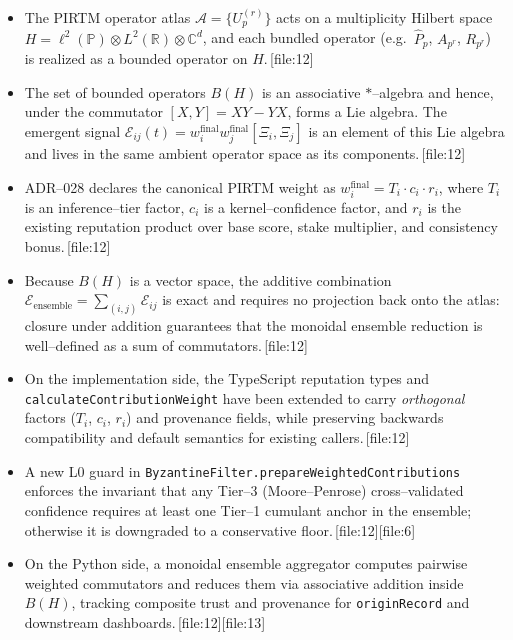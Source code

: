 \documentclass[11pt]{article}
\begin{document}
\begin{itemize}[leftmargin=*]
  \item The PIRTM operator atlas \(\mathcal{A} = \{U_p^{(r)}\}\) acts on a
  multiplicity Hilbert space
  \(H = \ell^2(\mathbb{P}) \otimes L^2(\mathbb{R}) \otimes \mathbb{C}^d\),
  and each bundled operator (e.g.\ \(\hat{P}_p\), \(A_{p^r}\), \(R_{p^r}\))
  is realized as a bounded operator on \(H\).\,[file:12]

  \item The set of bounded operators \(B(H)\) is an associative \(*\)--algebra
  and hence, under the commutator \([X,Y] = XY - YX\), forms a Lie algebra.
  The emergent signal
  \(\mathcal{E}_{ij}(t) = w_i^{\text{final}} w_j^{\text{final}} [\Xi_i,\Xi_j]\)
  is an element of this Lie algebra and lives in the same ambient operator
  space as its components.\,[file:12]

  \item ADR--028 declares the canonical PIRTM weight as
  \(w_i^{\text{final}} = T_i \cdot c_i \cdot r_i\), where
  \(T_i\) is an inference--tier factor, \(c_i\) is a kernel--confidence factor,
  and \(r_i\) is the existing reputation product over
  base score, stake multiplier, and consistency bonus.\,[file:12]

  \item Because \(B(H)\) is a vector space, the additive combination
  \(\mathcal{E}_{\text{ensemble}} = \sum_{(i,j)} \mathcal{E}_{ij}\) is exact
  and requires no projection back onto the atlas: closure under addition
  guarantees that the monoidal ensemble reduction is well--defined as a sum of
  commutators.\,[file:12]

  \item On the implementation side, the TypeScript reputation types and
  \texttt{calculateContributionWeight} have been extended to carry
  \emph{orthogonal} factors (\(T_i\), \(c_i\), \(r_i\)) and provenance fields,
  while preserving backwards compatibility and default semantics for existing
  callers.\,[file:12]

  \item A new L0 guard in
  \texttt{ByzantineFilter.prepareWeightedContributions} enforces the invariant
  that any Tier--3 (Moore--Penrose) cross--validated confidence requires at
  least one Tier--1 cumulant anchor in the ensemble; otherwise it is
  downgraded to a conservative floor.\,[file:12][file:6]

  \item On the Python side, a monoidal ensemble aggregator computes pairwise
  weighted commutators and reduces them via associative addition inside
  \(B(H)\), tracking composite trust and provenance for \texttt{originRecord}
  and downstream dashboards.\,[file:12][file:13]
\end{itemize}
\end{document}
